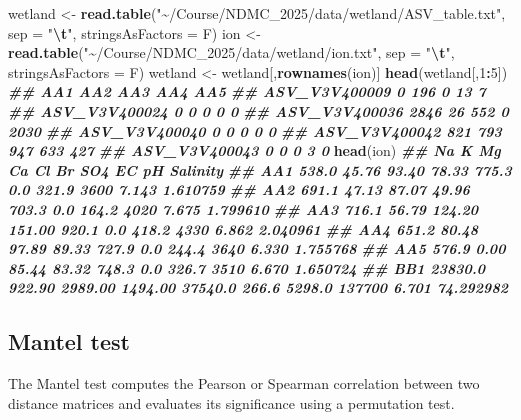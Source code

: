\documentclass[
]{article}
\newenvironment{Shaded}{\begin{snugshade}}{\end{snugshade}}
\newcommand{\AttributeTok}[1]{\textcolor[rgb]{0.13,0.29,0.53}{#1}}
\newcommand{\DecValTok}[1]{\textcolor[rgb]{0.00,0.00,0.81}{#1}}
\newcommand{\DocumentationTok}[1]{\textcolor[rgb]{0.56,0.35,0.01}{\textbf{\textit{#1}}}}
\newcommand{\FunctionTok}[1]{\textcolor[rgb]{0.13,0.29,0.53}{\textbf{#1}}}
\newcommand{\NormalTok}[1]{#1}
\newcommand{\OtherTok}[1]{\textcolor[rgb]{0.56,0.35,0.01}{#1}}
\newcommand{\SpecialCharTok}[1]{\textcolor[rgb]{0.81,0.36,0.00}{\textbf{#1}}}
\newcommand{\StringTok}[1]{\textcolor[rgb]{0.31,0.60,0.02}{#1}}
\begin{document}
\begin{Shaded}
\begin{Highlighting}[]
\NormalTok{wetland }\OtherTok{\textless{}{-}} \FunctionTok{read.table}\NormalTok{(}\StringTok{"\textasciitilde{}/Course/NDMC\_2025/data/wetland/ASV\_table.txt"}\NormalTok{, }\AttributeTok{sep =} \StringTok{"}\SpecialCharTok{\textbackslash{}t}\StringTok{"}\NormalTok{, }\AttributeTok{stringsAsFactors =}\NormalTok{ F)}
\NormalTok{ion }\OtherTok{\textless{}{-}} \FunctionTok{read.table}\NormalTok{(}\StringTok{"\textasciitilde{}/Course/NDMC\_2025/data/wetland/ion.txt"}\NormalTok{, }\AttributeTok{sep =} \StringTok{"}\SpecialCharTok{\textbackslash{}t}\StringTok{"}\NormalTok{, }\AttributeTok{stringsAsFactors =}\NormalTok{ F)}
\NormalTok{wetland }\OtherTok{\textless{}{-}}\NormalTok{ wetland[,}\FunctionTok{rownames}\NormalTok{(ion)]}
\FunctionTok{head}\NormalTok{(wetland[,}\DecValTok{1}\SpecialCharTok{:}\DecValTok{5}\NormalTok{])}
\DocumentationTok{\#\#                AA1 AA2 AA3 AA4  AA5}
\DocumentationTok{\#\# ASV\_V3V400009    0 196   0  13    7}
\DocumentationTok{\#\# ASV\_V3V400024    0   0   0   0    0}
\DocumentationTok{\#\# ASV\_V3V400036 2846  26 552   0 2030}
\DocumentationTok{\#\# ASV\_V3V400040    0   0   0   0    0}
\DocumentationTok{\#\# ASV\_V3V400042  821 793 947 633  427}
\DocumentationTok{\#\# ASV\_V3V400043    0   0   0   3    0}
\FunctionTok{head}\NormalTok{(ion)}
\DocumentationTok{\#\#          Na      K      Mg      Ca      Cl    Br    SO4     EC    pH  Salinity}
\DocumentationTok{\#\# AA1   538.0  45.76   93.40   78.33   775.3   0.0  321.9   3600 7.143  1.610759}
\DocumentationTok{\#\# AA2   691.1  47.13   87.07   49.96   703.3   0.0  164.2   4020 7.675  1.799610}
\DocumentationTok{\#\# AA3   716.1  56.79  124.20  151.00   920.1   0.0  418.2   4330 6.862  2.040961}
\DocumentationTok{\#\# AA4   651.2  80.48   97.89   89.33   727.9   0.0  244.4   3640 6.330  1.755768}
\DocumentationTok{\#\# AA5   576.9   0.00   85.44   83.32   748.3   0.0  326.7   3510 6.670  1.650724}
\DocumentationTok{\#\# BB1 23830.0 922.90 2989.00 1494.00 37540.0 266.6 5298.0 137700 6.701 74.292982}
\end{Highlighting}
\end{Shaded}

\hypertarget{mantel-test}{%
\subsection{Mantel test}\label{mantel-test}}

The Mantel test computes the Pearson or Spearman correlation between two
distance matrices and evaluates its significance using a permutation
test.
\end{document}
